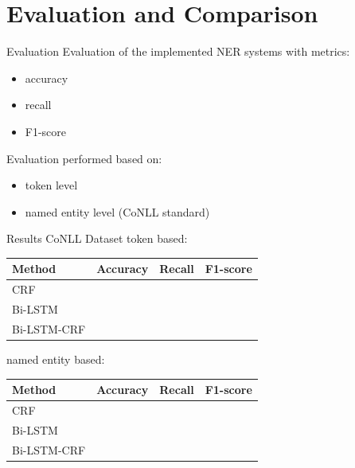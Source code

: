 \documentclass[12pt, tikz]{beamer}
\begin{document}
\section{Evaluation and Comparison}

\begin{frame}[fragile]{Evaluation}
	Evaluation of the implemented NER systems with metrics:
	\begin{itemize}
		\item accuracy
		\item recall
		\item F1-score
	\end{itemize}

	\pause
	
	Evaluation performed based on:
	\begin{itemize}
		\item token level
		\item named entity level (CoNLL standard)
	\end{itemize}
\end{frame}

\begin{frame}[fragile]{Results CoNLL Dataset}
	token based:
	\begin{center}
		\begin{tabular}{| l | c | c | c |}
			\hline
			Method & Accuracy & Recall & F1-score \\ \hline
			CRF &  &  &  \\ \hline
			Bi-LSTM &  &  &  \\ \hline
			Bi-LSTM-CRF &  &  &  \\ \hline
		\end{tabular}
	\end{center}

	named entity based:
	\begin{center}
		\begin{tabular}{| l | c | c | c |}
			\hline
			Method & Accuracy & Recall & F1-score \\ \hline
			CRF &  &  &  \\ \hline
			Bi-LSTM &  &  &  \\ \hline
			Bi-LSTM-CRF &  &  &  \\ \hline
		\end{tabular}
	\end{center}
\end{frame}
\end{document}
